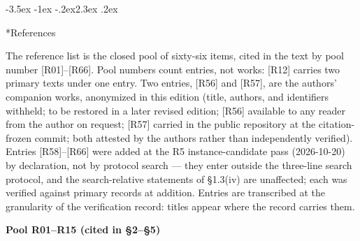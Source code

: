 \documentclass[11pt,a4paper]{article}
\makeatletter
\renewcommand\section{\@startsection{section}{1}{\z@}%
  {-3.5ex \@plus -1ex \@minus -.2ex}{2.3ex \@plus .2ex}%
  {\normalfont\Large\bfseries\raggedright}}
\makeatother
\begin{document}
\section*{References}

The reference list is the closed pool of sixty-six items, cited in the text by pool number [R01]–[R66]. Pool numbers count entries, not works: [R12] carries two primary texts under one entry. Two entries, [R56] and [R57], are the authors' companion works, anonymized in this edition (title, authors, and identifiers withheld; to be restored in a later revised edition; [R56] available to any reader from the author on request; [R57] carried in the public repository at the citation-frozen commit; both attested by the authors rather than independently verified). Entries [R58]–[R66] were added at the R5 instance-candidate pass (2026-10-20) by declaration, not by protocol search — they enter outside the three-line search protocol, and the search-relative statements of §1.3(iv) are unaffected; each was verified against primary records at addition. Entries are transcribed at the granularity of the verification record: titles appear where the record carries them.

\medskip
\noindent\textbf{Pool R01–R15 (cited in §2–§5)}\par\addvspace{2pt}
\end{document}
